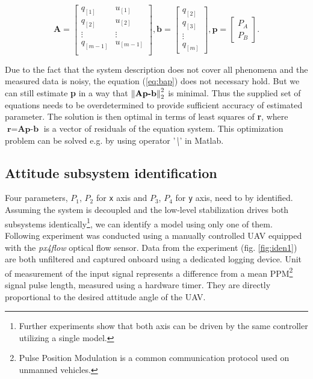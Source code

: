 \begin{equation}
\textbf{A} = \begin{bmatrix}
q_{[1]} & u_{[1]} \\
q_{[2]} & u_{[2]} \\
\vdots & \vdots \\
q_{[m-1]} & u_{[m-1]} \\
\end{bmatrix},
\textbf{b} = \begin{bmatrix}
q_{[2]} \\
q_{[3]} \\
\vdots\\
q_{[m]}
\end{bmatrix},
\textbf{p} = \begin{bmatrix}
P_A \\
P_B
\end{bmatrix}.
\end{equation}

Due to the fact that the system description does not cover all phenomena and the measured data is noisy, the equation (\ref{eq:bap}) does not necessary hold. But we can still estimate \textbf{p} in a way that $\left\lVert\textbf{Ap-b}\right\rVert_2^2$ is minimal. Thus the supplied set of equations needs to be overdetermined to provide sufficient accuracy of estimated parameter. The solution is then optimal in terms of least squares of \textbf{r}, where $\textbf{r} = \textbf{Ap-b}$ is a vector of residuals of the equation system. This optimization problem can be solved e.g. by using operator '\textit{\textbackslash}' in Matlab.

\subsection{Attitude subsystem identification}
\label{cap:attitude_subsystem_identification}

Four parameters, $P_1$, $P_2$ for \texttt{x} axis and $P_3$, $P_4$ for \texttt{y} axis, need to by identified. Assuming the system is decoupled and the low-level stabilization drives both subsystems identically\footnote{Further experiments show that both axis can be driven by the same controller utilizing a single model.}, we can identify a model using only one of them. Following experiment was conducted using a manually controlled UAV equipped with the \textit{px4flow} optical flow sensor. Data from the experiment (fig. \ref{fig:iden1}) are both unfiltered and captured onboard using a dedicated logging device. Unit of measurement of the input signal represents a difference from a mean PPM\footnote{Pulse Position Modulation is a common communication protocol used on unmanned vehicles.} signal pulse length, measured using a hardware timer. They are directly proportional to the desired attitude angle of the UAV.

